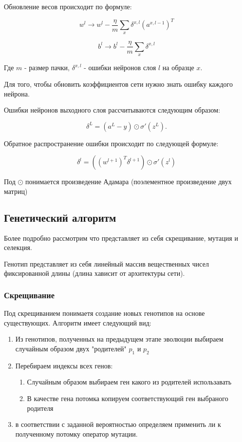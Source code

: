 \documentclass[a4paper,12pt]{article}
\begin{document}
Обновление весов происходит по формуле:

{\large $$
	w^l \rightarrow
  	w^l-\frac{\eta}{m} \sum_x \delta^{x,l} (a^{x,l-1})^T
$$}

{\large $$
	b^l \rightarrow b^l-\frac{\eta}{m}
  \sum_x \delta^{x,l}
$$}

Где $m$ - размер пачки, $\delta^{x,l}$ - ошибки нейронов слоя $l$ на образце $x$.

Для того, чтобы обновить коэффициентов сети нужно знать ошибку каждого нейрона.

Ошибки нейронов выходного слоя рассчитываются следующим образом:

{\large $$ \delta^L = (a^L-y) \odot \sigma'(z^L).$$}

Обратное распространение ошибки происходит по следующей формуле: 

{\large $$ \delta^l = ((w^{l+1})^T \delta^{l+1}) \odot \sigma'(z^l)$$}

Под $\odot$ понимается  произведение Адамара (поэлементное произведение двух матриц)

\subsection{Генетический алгоритм}
Более подробно рассмотрим что представляет из себя скрещивание, мутация и селекция.

Генотип представляет из себя линейный массив вещественных чисел фиксированной длины (длина хависит от архитектуры сети).

\subsubsection{Скрещивание}
Под скрещиванием понимаетя создание новых генотипов на основе существующих.
Алгоритм имеет следующий вид:
\begin{enumerate}
\item Из генотипов, полученных на предыдущем этапе эволюции выбираем случайным образом двух "родителей" $p_1$ и $p_2$
\item Перебираем индексы всех генов:
\begin{enumerate}
\item Случайным образом выбираем ген какого из родителей использавать
\item В качестве гена потомка копируем соответствующий ген выбраного родителя
\end{enumerate}

\item в соответствии с заданной вероятностью определяем применить ли к полученному потомку оператор мутации.

\end{enumerate}
\end{document}
